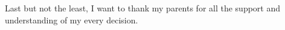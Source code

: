\begin{acknowledgements}
        Last but not the least, I want to thank my parents for all the support and understanding of my every decision.
        
        
        
        





        \end{acknowledgements}
        
